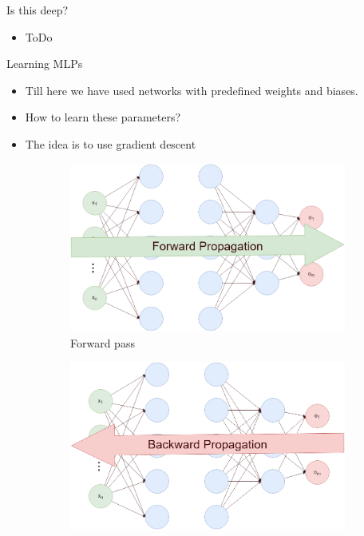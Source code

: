 \begin{frame}{Is this deep?}
    \begin{itemize}
        \item ToDo
    \end{itemize}
\end{frame}


\begin{frame}{Learning MLPs}
    \begin{itemize}
        \item Till here we have used networks with predefined weights and biases.
        \item How to learn these parameters?
        \medskip
        \medskip
        \medskip
        \item The idea is to use gradient descent
    \end{itemize}
    \begin{figure}
        \centering
        \begin{subfigure}[b]{0.3\textwidth}
            \includegraphics[width=\textwidth]{Figs/forward_propagation.png}
            \caption{Forward pass}
        \end{subfigure}
        \begin{subfigure}[b]{0.3\textwidth}
            \includegraphics[width=\textwidth]{Figs/backward_propagation.png}

\end{subfigure}
\end{figure}
\end{frame}
